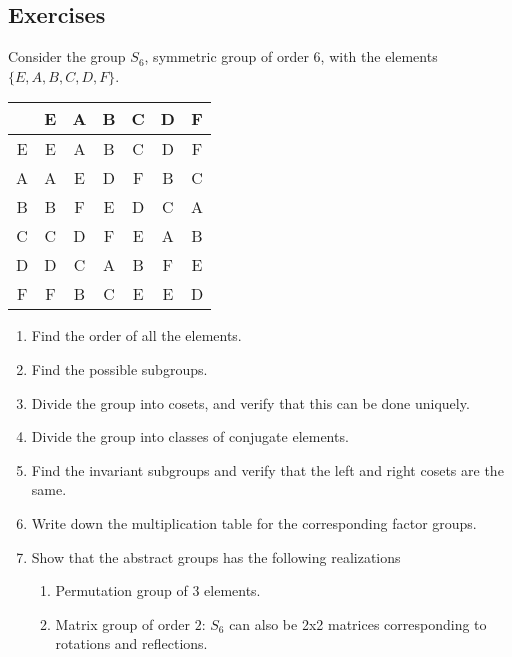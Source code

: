 
\subsection{Exercises} %
\label{sub:Exercices}

\begin{exercise}
Consider the group $S_6$, symmetric group of order $6$, with the elements
$\{E, A, B, C, D, F\}$.
\begin{center}
\begin{tabular}{ c|c c c c c c }
  & E & A & B & C & D & F \\
 \hline
    E & E & A & B & C & D & F \\
    A & A & E & D & F & B & C \\
    B & B & F & E & D & C & A \\
    C & C & D & F & E & A & B \\
    D & D & C & A & B & F & E \\
    F & F & B & C & E & E & D
\end{tabular}
\end{center}

\begin{enumerate}
    \item Find the order of all the elements.
    \item Find the possible subgroups.
    \item Divide the group into cosets, and verify that this can be done uniquely.
    \item Divide the group into classes of conjugate elements.
    \item Find the invariant subgroups and verify that the left and right
        cosets are the same.
    \item Write down the multiplication table for the corresponding factor
        groups.
    \item Show that the abstract groups has the following realizations

        \begin{enumerate}
            \item Permutation group of $3$ elements.
            \item Matrix group of order $2$: $S_6$ can also be 2x2 matrices
                corresponding to rotations and reflections.
        \end{enumerate}
\end{enumerate}
\end{exercise}

